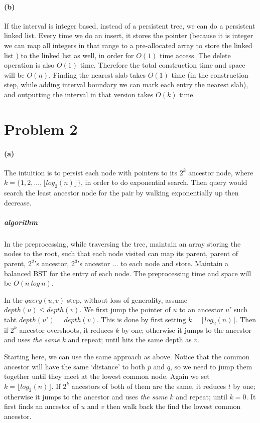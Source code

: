 \documentclass[10pt,letter]{article}
\begin{document}
\paragraph{(b)} If the interval is integer based, instead of a persistent tree, we can do a persistent linked list. Every time we do an insert, it stores the pointer (because it is integer we can map all integers in that range to a pre-allocated array to store the linked list ) to the linked list as well, in order for $O(1)$ time access. The delete operation is also $O(1)$ time. Therefore the total construction time and space will be $O(n)$. Finding the nearest slab takes $O(1)$ time (in the construction step, while adding interval boundary we can mark each entry the nearest slab), and outputting the interval in that version takes $O(k)$ time.

\pagebreak 

\section*{Problem 2}

\paragraph{(a)} The intuition is to persist each node with pointers to its $2^k$ ancestor node, where $k = \{1, 2, ..., \lfloor log_2(n)\rfloor\}$, in order to do exponential search. Then query would search the least ancestor node for the pair by walking exponentially up then decrease. 

\subparagraph{algorithm}
In the preprocessing, while traversing the tree, maintain an array storing the nodes to the root, such that each node visited can map its parent, parent of parent, $2^2$'s ancestor, $2^3$'s ancestor ... to each node and store. Maintain a balanced BST for the entry of each node. The preprocessing time and space will be $O(n\:log\:n)$.

In the $query(u,v)$ step, without loss of generality, assume $depth(u) \leq depth(v)$. We first jump the pointer of $u$ to an ancestor $u'$ such taht $depth(u') = depth(v)$. This is done by first setting $k = \lfloor log_2(n)\rfloor$. Then if $2^k$ ancestor overshoots, it reduces $k$ by one; otherwise it jumps to the ancestor and uses \emph{the same} $k$ and repeat; until hits the same depth as $v$.

Starting here, we can use the same approach as above. Notice that the common ancestor will have the same `distance' to both $p$ and $q$, so we need to jump them together until they meet at the lowest common node. Again we set $k = \lfloor log_2(n)\rfloor$. If $2^k$ ancestors of both of them are the same, it reduces $t$ by one; otherwise it jumps to the ancestor and uses \emph{the same} $k$ and repeat; until $k=0$. It first finds an ancestor of $u$ and $v$ then walk back the find the lowest common ancestor.
\end{document}
